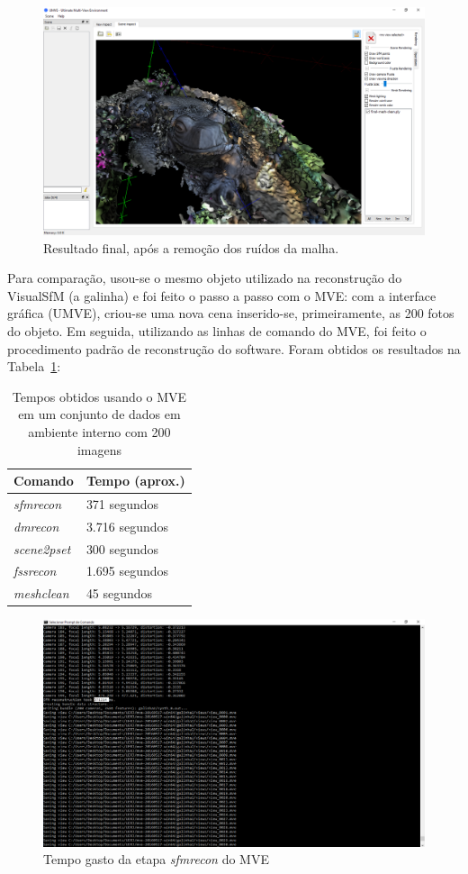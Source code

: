 \begin{figure}[!h]
	\centering
	\includegraphics[width=1\linewidth]{figs/mvemeshclean.png}
	\caption{%
	Resultado final, após a remoção dos ruídos da malha.
	}\label{fig:MVEMeshClean}
\end{figure} 

Para comparação, usou-se o mesmo objeto utilizado na reconstrução do VisualSfM (a
galinha) e foi feito o passo a passo com o MVE: com a interface gráfica (UMVE),
criou-se uma nova cena inserido-se, primeiramente, as 200 fotos do objeto. Em
seguida, utilizando as linhas de comando do MVE, foi feito o procedimento padrão
de reconstrução do software. Foram obtidos os resultados na Tabela~\ref{tab:galinha200mve}:

\begin{table}[!h]
\centering
\caption{Tempos obtidos usando o MVE em um conjunto de dados em ambiente interno com 200 imagens}
\label{tab:galinha200mve}
\begin{tabular}{|l|l|}
\hline
Comando            & Tempo (aprox.)         \\ \hline
\emph{sfmrecon}  & 371 segundos   \\ \hline
\emph{dmrecon}   & 3.716 segundos \\ \hline
\emph{scene2pset} & 300 segundos   \\ \hline
\emph{fssrecon}  & 1.695 segundos \\ \hline
\emph{meshclean} & 45 segundos    \\ \hline
\end{tabular}
\end{table}

\begin{figure}[!h]
	\centering
	\includegraphics[width=0.5\linewidth]{figs/galinhalongesfmreconmve.png}
	\caption{%
	Tempo gasto da etapa \emph{sfmrecon} do MVE
	}\label{fig:sfmrecon1}
\end{figure}

